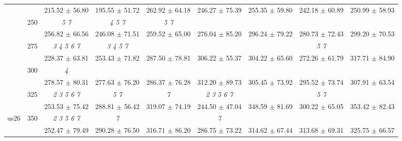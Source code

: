 \begin{table}[h]
{\begin{tabular}{
        ccccccccc}
 & & \cellcolor[HTML]{EFEFEF} 215.52 $\pm$ 56.80& \cellcolor[HTML]{EFEFEF} 195.55 $\pm$ 51.72& \cellcolor[HTML]{EFEFEF} 262.92 $\pm$ 64.18& \cellcolor[HTML]{EFEFEF} 246.27 $\pm$ 75.39& \cellcolor[HTML]{EFEFEF} 255.35 $\pm$ 59.80& \cellcolor[HTML]{EFEFEF} 242.18 $\pm$ 60.89& \cellcolor[HTML]{EFEFEF} 250.99 $\pm$ 58.93 \\ 
 & \multirow{2}{*}{250}& \textit{ 5 7 }& \textit{ 4 5 7 }& \textit{ 5 7 }& & & &  \\ 
 & & 256.82 $\pm$ 66.56& 246.08 $\pm$ 71.51& 259.52 $\pm$ 65.00& 276.04 $\pm$ 85.20& 296.24 $\pm$ 79.22& 280.73 $\pm$ 72.43& 299.20 $\pm$ 70.53 \\ 
 & \multirow{2}{*}{275}& \cellcolor[HTML]{EFEFEF} \textit{ 3 4 5 6 7 }& \cellcolor[HTML]{EFEFEF} \textit{ 3 4 5 7 }& \cellcolor[HTML]{EFEFEF} & \cellcolor[HTML]{EFEFEF} & \cellcolor[HTML]{EFEFEF} & \cellcolor[HTML]{EFEFEF} \textit{ 5 7 }& \cellcolor[HTML]{EFEFEF}  \\ 
 & & \cellcolor[HTML]{EFEFEF} 228.37 $\pm$ 63.81& \cellcolor[HTML]{EFEFEF} 253.43 $\pm$ 71.82& \cellcolor[HTML]{EFEFEF} 287.50 $\pm$ 78.81& \cellcolor[HTML]{EFEFEF} 306.22 $\pm$ 55.37& \cellcolor[HTML]{EFEFEF} 304.22 $\pm$ 65.60& \cellcolor[HTML]{EFEFEF} 272.26 $\pm$ 61.79& \cellcolor[HTML]{EFEFEF} 317.71 $\pm$ 84.90 \\ 
 & \multirow{2}{*}{300}& \textit{ 4 }& & & & & &  \\ 
 & & 278.57 $\pm$ 80.31& 277.63 $\pm$ 76.20& 286.37 $\pm$ 76.28& 312.20 $\pm$ 89.73& 305.45 $\pm$ 73.92& 295.52 $\pm$ 73.74& 307.91 $\pm$ 63.54 \\ 
 & \multirow{2}{*}{325}& \cellcolor[HTML]{EFEFEF} \textit{ 2 3 5 6 7 }& \cellcolor[HTML]{EFEFEF} \textit{ 5 7 }& \cellcolor[HTML]{EFEFEF} \textit{ 7 }& \cellcolor[HTML]{EFEFEF} \textit{ 2 3 5 6 7 }& \cellcolor[HTML]{EFEFEF} & \cellcolor[HTML]{EFEFEF} \textit{ 5 7 }& \cellcolor[HTML]{EFEFEF}  \\ 
 & & \cellcolor[HTML]{EFEFEF} 253.53 $\pm$ 75.42& \cellcolor[HTML]{EFEFEF} 288.81 $\pm$ 56.42& \cellcolor[HTML]{EFEFEF} 319.07 $\pm$ 74.19& \cellcolor[HTML]{EFEFEF} 244.50 $\pm$ 47.04& \cellcolor[HTML]{EFEFEF} 348.59 $\pm$ 81.69& \cellcolor[HTML]{EFEFEF} 300.22 $\pm$ 65.05& \cellcolor[HTML]{EFEFEF} 353.42 $\pm$ 82.43 \\ 
 \multirow{4}{*}{us26} & \multirow{2}{*}{350}& \textit{ 2 3 5 6 7 }& \textit{ 7 }& & \textit{ 7 }& & &  \\ 
 & & 252.47 $\pm$ 79.49& 290.28 $\pm$ 76.50& 316.71 $\pm$ 86.20& 286.75 $\pm$ 73.22& 314.62 $\pm$ 67.44& 313.68 $\pm$ 69.31& 325.75 $\pm$ 66.57 \\ 

\end{tabular}}
\end{table}
